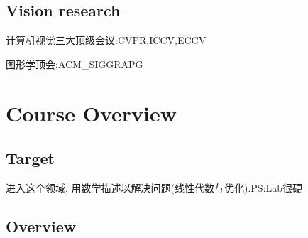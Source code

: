     \subsection{Vision research}
    计算机视觉三大顶级会议:CVPR,ICCV,ECCV

    图形学顶会:ACM\_SIGGRAPG
    \section{Course Overview}
    \subsection{Target}
    进入这个领域, 用数学描述以解决问题(线性代数与优化).PS:Lab很硬
    \subsection{Overview}
